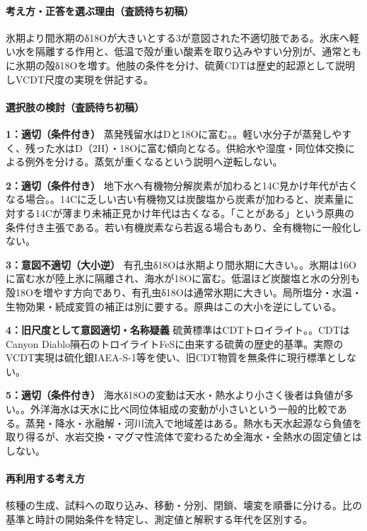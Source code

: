 \paragraph{考え方・正答を選ぶ理由（査読待ち初稿）} 氷期より間氷期のδ18Oが大きいとする3が意図された不適切肢である。氷床へ軽い水を隔離する作用と、低温で殻が重い酸素を取り込みやすい分別が、通常ともに氷期の殻δ18Oを増す。他肢の条件を分け、硫黄CDTは歴史的起源として説明しVCDT尺度の実現を併記する。

\paragraph{選択肢の検討（査読待ち初稿）}\mbox{}\par

\noindent\textbf{1：適切（条件付き）} 蒸発残留水はDと18Oに富む。。軽い水分子が蒸発しやすく、残った水はD（2H）・18Oに富む傾向となる。供給水や湿度・同位体交換による例外を分ける。蒸気が重くなるという説明へ逆転しない。\par

\noindent\textbf{2：適切（条件付き）} 地下水へ有機物分解炭素が加わると14C見かけ年代が古くなる場合。。14Cに乏しい古い有機物又は炭酸塩から炭素が加わると、炭素量に対する14Cが薄まり未補正見かけ年代は古くなる。「ことがある」という原典の条件付き主張である。若い有機炭素なら若返る場合もあり、全有機物に一般化しない。\par

\noindent\textbf{3：意図不適切（大小逆）} 有孔虫δ18Oは氷期より間氷期に大きい。。氷期は16Oに富む水が陸上氷に隔離され、海水が18Oに富む。低温ほど炭酸塩と水の分別も殻18Oを増やす方向であり、有孔虫δ18Oは通常氷期に大きい。局所塩分・水温・生物効果・続成変質の補正は別に要する。原典はこの大小を逆にしている。\par

\noindent\textbf{4：旧尺度として意図適切・名称疑義} 硫黄標準はCDTトロイライト。。CDTはCanyon Diablo隕石のトロイライトFeSに由来する硫黄の歴史的基準。実際のVCDT実現は硫化銀IAEA-S-1等を使い、旧CDT物質を無条件に現行標準としない。\par

\noindent\textbf{5：適切（条件付き）} 海水δ18Oの変動は天水・熱水より小さく後者は負値が多い。。外洋海水は天水に比べ同位体組成の変動が小さいという一般的比較である。蒸発・降水・氷融解・河川流入で地域差はある。熱水も天水起源なら負値を取り得るが、水岩交換・マグマ性流体で変わるため全海水・全熱水の固定値とはしない。\par

\paragraph{再利用する考え方} 核種の生成、試料への取り込み、移動・分別、閉鎖、壊変を順番に分ける。比の基準と時計の開始条件を特定し、測定値と解釈する年代を区別する。

